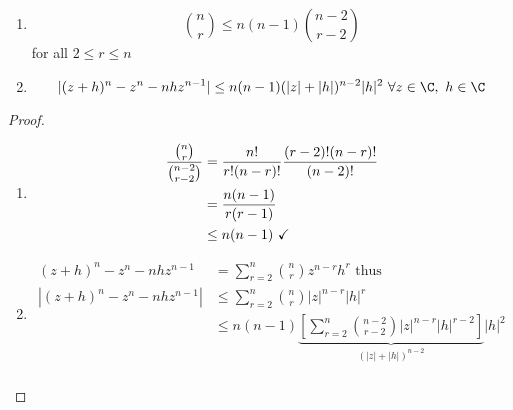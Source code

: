 \begin{lemma}
\hfill{ }
\begin{enumerate}
    \item \[\binom{n}{r} \leq n(n-1)\binom{n-2}{r-2}\]
    for all $2\leq r\leq n$
    \item \[|(z+h)^n - z^n - nhz^{n-1}|\leq n(n-1)(|z| + |h|)^{n-2}|h|^2 \ \forall z\in \C, \ h\in \C\]
\end{enumerate}
\begin{proof}
\hfill{ }
\begin{enumerate}
    \item
    \begin{align*}
        \frac{\binom{n}{r}}{\binom{n-2}{r-2}} &=\frac{n!}{r!(n-r)!}\frac{(r-2)!(n-r)!}{(n-2)!}\\
        &=\frac{n(n-1)}{r(r-1)}\\
        &\leq n(n-1) \ \checkmark
    \end{align*}
    \item
    \begin{align*}
        (z+h)^n - z^n - nhz^{n-1} &=\sum_{r=2}^n\binom{n}{r}z^{n-r}h^r \text{ thus}\\
        |(z+h)^n - z^n - nhz^{n-1}|&\leq \sum_{r=2}^n\binom{n}{r}|z|^{n-r}|h|^r\\
        &\leq n(n-1)\underbrace{\left[\sum_{r=2}^n\binom{n-2}{r-2}|z|^{n-r}|h|^{r-2}\right]}_{(|z|+|h|)^{n-2}}|h|^2\\
    \end{align*}
\end{enumerate}
\end{proof}
\end{lemma}
